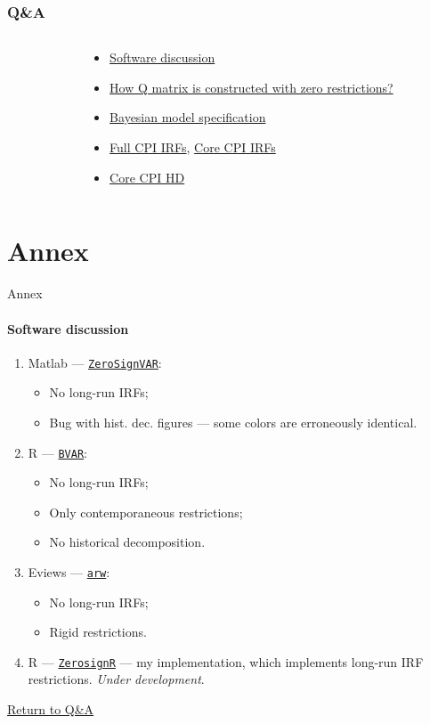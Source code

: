 \documentclass{beamer}
\begin{document}
\begin{frame}
	\frametitle{Q\&A}
	\label{qa}
	\begin{columns}
		\begin{column}{0.49\textwidth}
			\tableofcontents[hideothersubsections]
		\end{column}
		\begin{column}{0.49\textwidth}
			\begin{itemize}
				\item \hyperlink{software}{Software discussion}
				\item \hyperlink{zero_q}{How Q matrix is constructed with zero restrictions?}
				\item \hyperlink{bvar}{Bayesian model specification}
				\item \hyperlink{fullirfs}{Full CPI IRFs},  \hyperlink{coreirfs}{Core CPI IRFs}
				\item \hyperlink{corehd}{Core CPI HD}
			\end{itemize}
		\end{column}
	\end{columns}
\end{frame}

\section{Annex}
\begin{frame}[noframenumbering]{Annex}
\framesubtitle{Software discussion}
	\label{software}
	\begin{enumerate}
		\item Matlab --- \href{https://eeecon.uibk.ac.at/~breitenlechner/data/ZeroSignVAR.zip}{\texttt{ZeroSignVAR}}:
		\begin{itemize}
			\item No long-run IRFs;
			\item Bug with hist. dec. figures --- some colors are erroneously identical. 
		\end{itemize}
		\item R --- \href{https://cran.r-project.org/package=BVAR}{\texttt{BVAR}}:
			\begin{itemize}
			\item No long-run IRFs;
			\item Only contemporaneous restrictions;
			\item No historical decomposition. 
		\end{itemize}
		\item Eviews --- \href{https://www.eviews.com/Addins/arw.aipz}{\texttt{arw}}:
		\begin{itemize}
			\item No long-run IRFs;
			\item Rigid restrictions.
		\end{itemize}
		\item R --- \href{https://github.com/roootra/ZerosignR}{\texttt{ZerosignR}} --- my implementation, which implements long-run IRF restrictions. \textit{Under development}.
	\end{enumerate}
	\hyperref[qa]{Return to Q\&A}
\end{frame}
\end{document}
